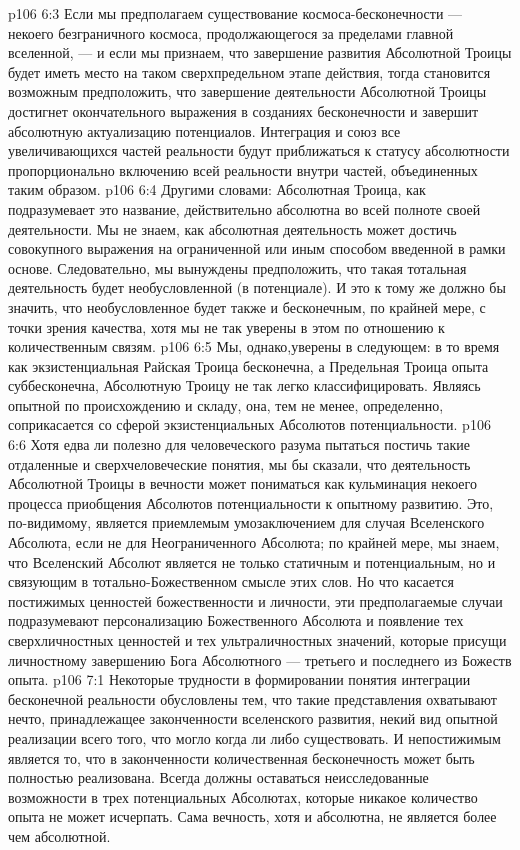 \vs p106 6:3 Если мы предполагаем существование космоса\hyp{}бесконечности --- некоего безграничного космоса, продолжающегося за пределами главной вселенной, --- и если мы признаем, что завершение развития Абсолютной Троицы будет иметь место на таком сверхпредельном этапе действия, тогда становится возможным предположить, что завершение деятельности Абсолютной Троицы достигнет окончательного выражения в созданиях бесконечности и завершит абсолютную актуализацию  потенциалов. Интеграция и союз все увеличивающихся частей реальности будут приближаться к статусу абсолютности пропорционально включению всей реальности внутри частей, объединенных таким образом.
\vs p106 6:4 Другими словами: Абсолютная Троица, как подразумевает это название, действительно абсолютна во всей полноте своей деятельности. Мы не знаем, как абсолютная деятельность может достичь совокупного выражения на ограниченной или иным способом введенной в рамки основе. Следовательно, мы вынуждены предположить, что такая тотальная деятельность будет необусловленной (в потенциале). И это к тому же должно бы значить, что необусловленное будет также и бесконечным, по крайней мере, с точки зрения качества, хотя мы не так уверены в этом по отношению к количественным связям.
\vs p106 6:5 Мы, однако,уверены в следующем: в то время как экзистенциальная Райская Троица бесконечна, а Предельная Троица опыта суббесконечна, Абсолютную Троицу не так легко классифицировать. Являясь опытной по происхождению и складу, она, тем не менее, определенно, соприкасается со сферой экзистенциальных Абсолютов потенциальности.
\vs p106 6:6 Хотя едва ли полезно для человеческого разума пытаться постичь такие отдаленные и сверхчеловеческие понятия, мы бы сказали, что деятельность Абсолютной Троицы в вечности может пониматься как кульминация некоего процесса приобщения Абсолютов потенциальности к опытному развитию. Это, по\hyp{}видимому, является приемлемым умозаключением для случая Вселенского Абсолюта, если не для Неограниченного Абсолюта; по крайней мере, мы знаем, что Вселенский Абсолют является не только статичным и потенциальным, но и связующим в тотально\hyp{}Божественном смысле этих слов. Но что касается постижимых ценностей божественности и личности, эти предполагаемые случаи подразумевают персонализацию Божественного Абсолюта и появление тех сверхличностных ценностей и тех ультраличностных значений, которые присущи личностному завершению Бога Абсолютного --- третьего и последнего из Божеств опыта.
\vs p106 7:1 Некоторые трудности в формировании понятия интеграции бесконечной реальности обусловлены тем, что такие представления охватывают нечто, принадлежащее законченности вселенского развития, некий вид опытной реализации всего того, что могло когда ли либо существовать. И непостижимым является то, что в законченности количественная бесконечность может быть полностью реализована. Всегда должны оставаться неисследованные возможности в трех потенциальных Абсолютах, которые никакое количество опыта не может исчерпать. Сама вечность, хотя и абсолютна, не является более чем абсолютной.
